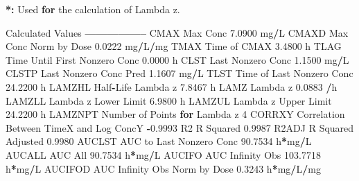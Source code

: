 \documentclass[12pt,]{krantz}
\newenvironment{Shaded}{\begin{snugshade}}{\end{snugshade}}
\newcommand{\DecValTok}[1]{\textcolor[rgb]{0.00,0.00,0.81}{#1}}
\newcommand{\FloatTok}[1]{\textcolor[rgb]{0.00,0.00,0.81}{#1}}
\newcommand{\StringTok}[1]{\textcolor[rgb]{0.31,0.60,0.02}{#1}}
\newcommand{\ControlFlowTok}[1]{\textcolor[rgb]{0.13,0.29,0.53}{\textbf{#1}}}
\newcommand{\OperatorTok}[1]{\textcolor[rgb]{0.81,0.36,0.00}{\textbf{#1}}}
\newcommand{\ErrorTok}[1]{\textcolor[rgb]{0.64,0.00,0.00}{\textbf{#1}}}
\newcommand{\NormalTok}[1]{#1}
\theoremstyle{definition}
\theoremstyle{definition}
\theoremstyle{definition}
\theoremstyle{remark}
\begin{document}
\begin{Shaded}
\begin{Highlighting}[]
{{{{\OperatorTok{*}\ErrorTok{:}\StringTok{ }\NormalTok{Used }\ControlFlowTok{for}\NormalTok{ the calculation of Lambda z.}


\NormalTok{Calculated Values}
\OperatorTok{-----------------}
\NormalTok{CMAX       Max Conc                                        }\FloatTok{7.0900}\NormalTok{ mg}\OperatorTok{/}\NormalTok{L}
\NormalTok{CMAXD      Max Conc Norm by Dose                           }\FloatTok{0.0222}\NormalTok{ mg}\OperatorTok{/}\NormalTok{L}\OperatorTok{/}\NormalTok{mg}
\NormalTok{TMAX       Time of CMAX                                    }\FloatTok{3.4800}\NormalTok{ h}
\NormalTok{TLAG       Time Until First Nonzero Conc                   }\FloatTok{0.0000}\NormalTok{ h}
\NormalTok{CLST       Last Nonzero Conc                               }\FloatTok{1.1500}\NormalTok{ mg}\OperatorTok{/}\NormalTok{L}
\NormalTok{CLSTP      Last Nonzero Conc Pred                          }\FloatTok{1.1607}\NormalTok{ mg}\OperatorTok{/}\NormalTok{L}
\NormalTok{TLST       Time of Last Nonzero Conc                      }\FloatTok{24.2200}\NormalTok{ h}
\NormalTok{LAMZHL     Half}\OperatorTok{-}\NormalTok{Life Lambda z                              }\FloatTok{7.8467}\NormalTok{ h}
\NormalTok{LAMZ       Lambda z                                        }\FloatTok{0.0883} \OperatorTok{/}\NormalTok{h}
\NormalTok{LAMZLL     Lambda z Lower Limit                            }\FloatTok{6.9800}\NormalTok{ h}
\NormalTok{LAMZUL     Lambda z Upper Limit                           }\FloatTok{24.2200}\NormalTok{ h}
\NormalTok{LAMZNPT    Number of Points }\ControlFlowTok{for}\NormalTok{ Lambda z                   }\DecValTok{4}
\NormalTok{CORRXY     Correlation Between TimeX and Log ConcY        }\OperatorTok{-}\FloatTok{0.9993} 
\NormalTok{R2         R Squared                                       }\FloatTok{0.9987} 
\NormalTok{R2ADJ      R Squared Adjusted                              }\FloatTok{0.9980} 
\NormalTok{AUCLST     AUC to Last Nonzero Conc                       }\FloatTok{90.7534}\NormalTok{ h}\OperatorTok{*}\NormalTok{mg}\OperatorTok{/}\NormalTok{L}
\NormalTok{AUCALL     AUC All                                        }\FloatTok{90.7534}\NormalTok{ h}\OperatorTok{*}\NormalTok{mg}\OperatorTok{/}\NormalTok{L}
\NormalTok{AUCIFO     AUC Infinity Obs                              }\FloatTok{103.7718}\NormalTok{ h}\OperatorTok{*}\NormalTok{mg}\OperatorTok{/}\NormalTok{L}
\NormalTok{AUCIFOD    AUC Infinity Obs Norm by Dose                   }\FloatTok{0.3243}\NormalTok{ h}\OperatorTok{*}\NormalTok{mg}\OperatorTok{/}\NormalTok{L}\OperatorTok{/}\NormalTok{mg}
}}}}
\end{Highlighting}
\end{Shaded}
\end{document}
